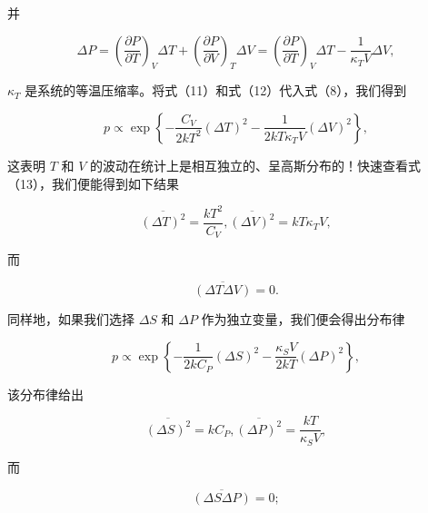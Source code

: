 并

\begin{equation}\tag{15.1.12}\label{eq:15.1.12}
\Delta P = \left( \frac { \partial P } { \partial T } \right) _ { V } \Delta T + \left( \frac { \partial P } { \partial V } \right) _ { T } \Delta V = \left( \frac { \partial P } { \partial T } \right) _ { V } \Delta T - \frac { 1 } { \kappa _ { T } V } \Delta V ,
\end{equation}

\(\kappa_{T}\) 是系统的等温压缩率。将式（11）和式（12）代入式（8），我们得到

\begin{equation}\tag{15.1.13}\label{eq:15.1.13}
p \propto \exp \left\{ - \frac { C _ { V } } { 2 k T ^{2} } ( \Delta T ) ^{2} - \frac { 1 } { 2 k T \kappa _ { T } V } ( \Delta V ) ^{2} \right\} ,
\end{equation}

这表明 \(T\) 和 \(V\) 的波动在统计上是相互独立的、呈高斯分布的！快速查看式（13），我们便能得到如下结果

\begin{equation}\tag{15.1.14}\label{eq:15.1.14}
\overline { { ( \Delta T ) ^{2} } } = \frac { k T ^{2} } { C _ { V } } ,  \overline { { ( \Delta V ) ^{2} } } = k T \kappa _ { T } V ,
\end{equation}

而

\begin{equation}\tag{15.1.15}\label{eq:15.1.15}
\overline { { ( \Delta T \Delta V ) } } = 0 .
\end{equation}

同样地，如果我们选择 \(\Delta S\) 和 \(\Delta P\) 作为独立变量，我们便会得出分布律

\begin{equation}\tag{15.1.16}\label{eq:15.1.16}
p \propto \exp \left\{ - \frac { 1 } { 2 k C _ { P } } ( \Delta S ) ^{2} - \frac { \kappa _ { S } V } { 2 k T } ( \Delta P ) ^{2} \right\} ,
\end{equation}

该分布律给出

\begin{equation}\tag{15.1.17}\label{eq:15.1.17}
\overline { { ( \Delta S ) ^{2} } } = k C _ { P } ,  \overline { { ( \Delta P ) ^{2} } } = \frac { k T } { \kappa _ { S } V } ,
\end{equation}

而

\begin{equation}\tag{15.1.18}\label{eq:15.1.18}
\overline { { ( \Delta S \Delta P ) } } = 0 ;
\end{equation}

